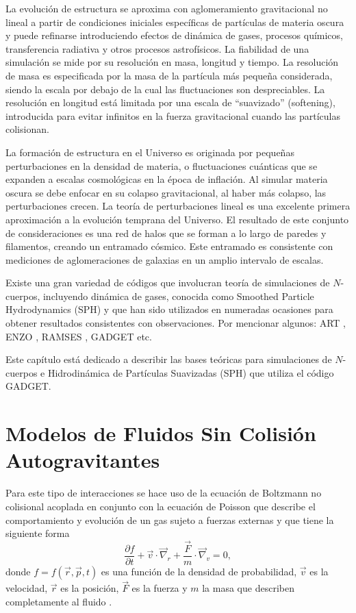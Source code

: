 \documentclass[a4paper,openright,12pt]{book}
\begin{document}
La evolución de estructura se aproxima con aglomeramiento gravitacional  no lineal a partir de condiciones iniciales específicas de partículas de materia oscura y puede refinarse introduciendo efectos de dinámica de gases, procesos químicos, transferencia radiativa y otros procesos astrofísicos. La fiabilidad de una simulación se mide por su resolución en masa, longitud y tiempo. La resolución de masa es especificada por la masa de la partícula más pequeña considerada, siendo la escala por debajo de la cual las fluctuaciones son despreciables. La resolución en longitud está limitada por una escala de ``suavizado'' (softening), introducida para evitar infinitos en la fuerza gravitacional cuando las partículas colisionan.

La formación de estructura en el Universo es originada por pequeñas perturbaciones en la densidad de materia, o fluctuaciones cuánticas que se expanden a escalas cosmológicas en la época de inflación. Al simular materia oscura se debe enfocar en su colapso gravitacional, al haber más colapso, las perturbaciones crecen. La teoría de perturbaciones lineal es una excelente primera aproximación a la evolución temprana del Universo. El resultado de este conjunto de consideraciones es una red de halos que se forman a lo largo de paredes y filamentos, creando un entramado cósmico. Este entramado es consistente con mediciones de aglomeraciones de galaxias en un amplio intervalo de escalas.

Existe una gran variedad de códigos que involucran teoría de simulaciones de $N$-cuerpos, incluyendo dinámica de gases, conocida como Smoothed Particle Hydrodynamics (SPH) y que han sido utilizados en numeradas ocasiones para obtener resultados consistentes con observaciones. Por mencionar algunos: ART \cite{2.1.1}, ENZO \cite{2.1.2}, RAMSES \cite{2.1.3}, GADGET \cite{b4} etc.

Este capítulo está dedicado a describir las bases teóricas para simulaciones de $N$-cuerpos e Hidrodinámica de Partículas Suavizadas (SPH) que utiliza el código GADGET.

\section{Modelos de Fluidos Sin Colisión Autogravitantes}
Para este tipo de interacciones se hace uso de la ecuación de Boltzmann no colisional acoplada en conjunto con la ecuación de Poisson que describe el comportamiento y evolución de un gas sujeto a fuerzas externas y que tiene la siguiente forma 
\begin{equation}
\frac{\partial f}{\partial t} + \vec{v}\cdot\vec\nabla_{r} + \frac{\vec{F}}{m}\cdot\vec\nabla_{v}=0,\label{eqn2.1}
\end{equation}
donde $f= f(\vec{r}, \vec{p}, t)$ es una función de la densidad de probabilidad, $\vec{v}$ es la velocidad, $\vec{r}$ es la posición, $\vec{F}$ es la fuerza y $m$ la masa que describen completamente al fluido \cite{b3}.
\end{document}
